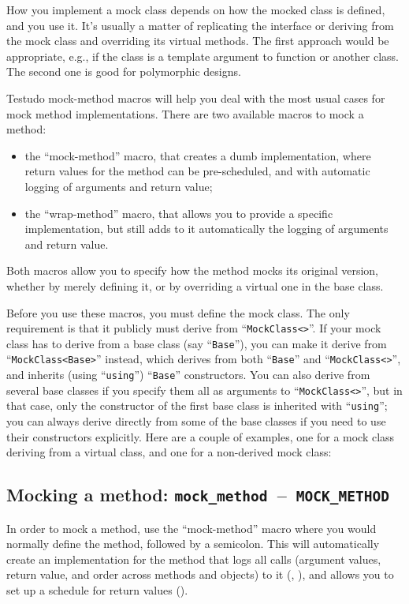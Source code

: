 \documentclass[twoside, a4paper, article]{memoir}
\newcommand*\testudocolor{\color{red!80!blue}}
\newcommand*\testudo[1]{\texttt{\testudocolor{}#1}}
\newcommand*\testudopair[2]{\testudo{#1}~--~\testudo{#2}}
\newcommand\subsectiontestudopair[3]{%
  \subsection[#1]{#1: \testudopair{#2}{#3}}}
\providecommand\typesetexample[1]{%
}
\begin{document}
How you implement a mock class depends on how the mocked class is defined, and
you use it.  It's usually a matter of replicating the interface or deriving
from the mock class and overriding its virtual methods.  The first approach
would be appropriate, e.g., if the class is a template argument to function or
another class.  The second one is good for polymorphic designs.

Testudo mock-method macros will help you deal with the most usual cases for
mock method implementations.  There are two available macros to mock a method:
\begin{itemize}
\item the ``mock-method'' macro, that creates a dumb implementation, where
  return values for the method can be pre-scheduled, and with automatic
  logging of arguments and return value;
\item the ``wrap-method'' macro, that allows you to provide a specific
  implementation, but still adds to it automatically the logging of arguments
  and return value.
\end{itemize}
Both macros allow you to specify how the method mocks its original version,
whether by merely defining it, or by overriding a virtual one in the base
class.

Before you use these macros, you must define the mock class.  The only
requirement is that it publicly must derive from ``\texttt{MockClass<>}''.  If
your mock class has to derive from a base class (say ``\texttt{Base}''), you
can make it derive from ``\texttt{MockClass<Base>}'' instead, which derives
from both ``\texttt{Base}'' and ``\texttt{MockClass<>}'', and inherits (using
``\texttt{using}'') ``\texttt{Base}'' constructors.  You can also derive from
several base classes if you specify them all as arguments to
``\texttt{MockClass<>}'', but in that case, only the constructor of the first
base class is inherited with ``\texttt{using}''; you can always derive directly
from some of the base classes if you need to use their constructors explicitly.
Here are a couple of examples, one for a mock class deriving from a virtual
class, and one for a non-derived mock class:

\typesetexample{mock-class}

\subsectiontestudopair{Mocking a method}{mock\_method}{MOCK\_METHOD}
\label{sec:mocking-method}

In order to mock a method, use the ``mock-method'' macro where you would
normally define the method, followed by a semicolon.  This will automatically
create an implementation for the method that logs all calls (argument values,
return value, and order across methods and objects) to it
(, ), and
allows you to set up a schedule for return values
().
\end{document}
